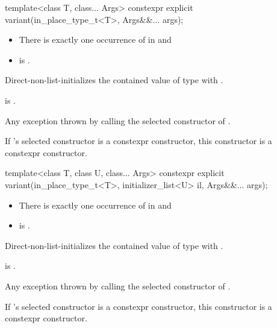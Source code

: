 %
\begin{itemdecl}
template<class T, class... Args> constexpr explicit variant(in_place_type_t<T>, Args&&... args);
\end{itemdecl}

\begin{itemdescr}
\pnum
\constraints
\begin{itemize}
\item There is exactly one occurrence of  in  and
\item {} is .
\end{itemize}

\pnum
\effects
Direct-non-list-initializes the contained value of type 
with .

\pnum
\ensures
{} is .

\pnum
\throws
Any exception thrown by calling the selected constructor of .

\pnum
\remarks
If 's selected constructor is a constexpr constructor, this
constructor is a constexpr constructor.
\end{itemdescr}

%
\begin{itemdecl}
template<class T, class U, class... Args>
  constexpr explicit variant(in_place_type_t<T>, initializer_list<U> il, Args&&... args);
\end{itemdecl}

\begin{itemdescr}
\pnum
\constraints
\begin{itemize}
\item There is exactly one occurrence of  in  and
\item {} is .
\end{itemize}

\pnum
\effects
Direct-non-list-initializes the contained value of type 
with .

\pnum
\ensures
{} is .

\pnum
\throws
Any exception thrown by calling the selected constructor of .

\pnum
\remarks
If 's selected constructor is a constexpr constructor, this
constructor is a constexpr constructor.
\end{itemdescr}

